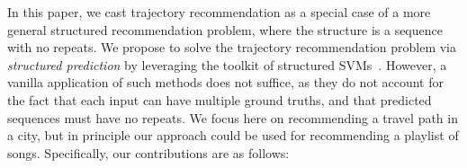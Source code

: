 In this paper, we cast trajectory recommendation as a special case of a more general
structured recommendation problem, where the structure is a sequence with no repeats.
We propose to solve the trajectory recommendation problem
via \emph{structured prediction} by leveraging the toolkit of structured
SVMs~\citep{taskar2004max,tsochantaridis2004support}.
However, a vanilla application of such methods does not suffice,
as they do not account for the fact that each input can have multiple ground truths,
and that predicted sequences must have no repeats.
We focus here on recommending a travel path in a city, but in principle our approach could be
used for recommending a playlist of songs.
Specifically, our contributions are as follows:
